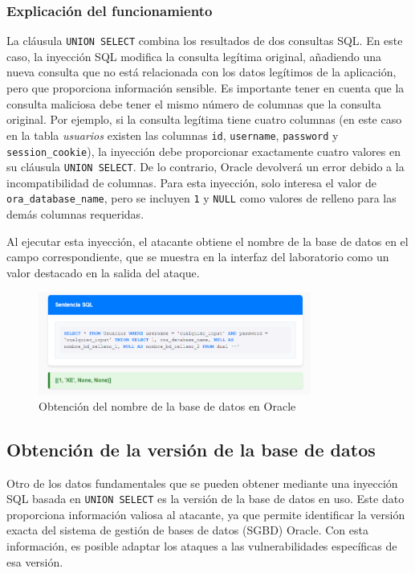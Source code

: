 \documentclass[a4paper,12pt]{article}
\begin{document}
\subsubsection{Explicación del funcionamiento}
La cláusula \texttt{UNION SELECT} combina los resultados de dos consultas SQL. En este caso, la inyección SQL modifica la consulta legítima original, añadiendo una nueva consulta que no está relacionada con los datos legítimos de la aplicación, pero que proporciona información sensible. Es importante tener en cuenta que la consulta maliciosa debe tener el mismo número de columnas que la consulta original.
Por ejemplo, si la consulta legítima tiene cuatro columnas (en este caso en la tabla \textit{usuarios} existen las columnas \texttt{id}, \texttt{username}, \texttt{password} y \texttt{session\_cookie}), la inyección debe proporcionar exactamente cuatro valores en su cláusula \texttt{UNION SELECT}. De lo contrario, Oracle devolverá un error debido a la incompatibilidad de columnas. Para esta inyección, solo interesa el valor de \texttt{ora\_database\_name}, pero se incluyen \texttt{1} y \texttt{NULL} como valores de relleno para las demás columnas requeridas.

Al ejecutar esta inyección, el atacante obtiene el nombre de la base de datos en el campo correspondiente, que se muestra en la interfaz del laboratorio como un valor destacado en la salida del ataque.

\begin{figure}[H]
    \centering
    \includegraphics[width=0.8\textwidth]{Imagenes/union3.png}
    \caption{Obtención del nombre de la base de datos en Oracle}
\end{figure}

\subsection{Obtención de la versión de la base de datos}
Otro de los datos fundamentales que se pueden obtener mediante una inyección SQL basada en \texttt{UNION SELECT} es la versión de la base de datos en uso. Este dato proporciona información valiosa al atacante, ya que permite identificar la versión exacta del sistema de gestión de bases de datos (SGBD) Oracle. Con esta información, es posible adaptar los ataques a las vulnerabilidades específicas de esa versión.
\end{document}
